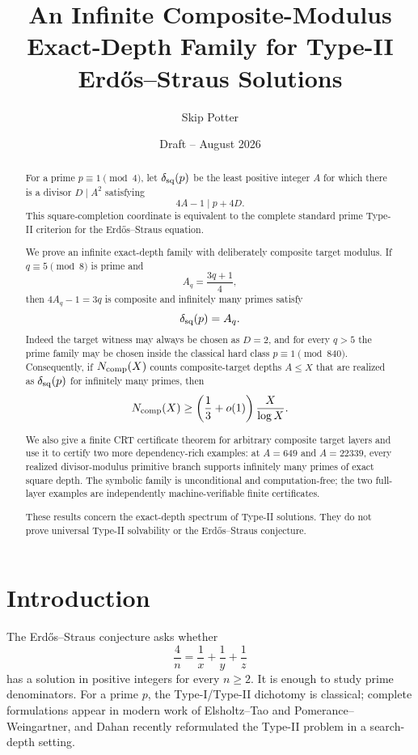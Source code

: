 \documentclass[11pt]{article}
\title{An Infinite Composite-Modulus Exact-Depth Family for Type-II Erd\H{o}s--Straus Solutions}
\author{Skip Potter}
\date{Draft -- August 2026}
\theoremstyle{definition}
\begin{document}
\maketitle

\begin{abstract}
For a prime $p\equiv1\pmod4$, let $\delta_{\rm sq}(p)$ be the least positive integer $A$ for which there is a divisor $D\mid A^2$ satisfying
\[
4A-1\mid p+4D.
\]
This square-completion coordinate is equivalent to the complete standard prime Type-II criterion for the Erd\H{o}s--Straus equation.

We prove an infinite exact-depth family with deliberately composite target modulus.  If $q\equiv5\pmod8$ is prime and
\[
A_q=\frac{3q+1}{4},
\]
then $4A_q-1=3q$ is composite and infinitely many primes satisfy
\[
\delta_{\rm sq}(p)=A_q.
\]
Indeed the target witness may always be chosen as $D=2$, and for every $q>5$ the prime family may be chosen inside the classical hard class $p\equiv1\pmod{840}$.  Consequently, if $N_{\rm comp}(X)$ counts composite-target depths $A\le X$ that are realized as $\delta_{\rm sq}(p)$ for infinitely many primes, then
\[
N_{\rm comp}(X)\ge\left(\frac13+o(1)\right)\frac{X}{\log X}.
\]

We also give a finite CRT certificate theorem for arbitrary composite target layers and use it to certify two more dependency-rich examples: at $A=649$ and $A=22339$, every realized divisor-modulus primitive branch supports infinitely many primes of exact square depth.  The symbolic family is unconditional and computation-free; the two full-layer examples are independently machine-verifiable finite certificates.

These results concern the exact-depth spectrum of Type-II solutions.  They do not prove universal Type-II solvability or the Erd\H{o}s--Straus conjecture.
\end{abstract}

\section{Introduction}
The Erd\H{o}s--Straus conjecture asks whether
\[
\frac4n=\frac1x+\frac1y+\frac1z
\]
has a solution in positive integers for every $n\ge2$.  It is enough to study prime denominators.  For a prime $p$, the Type-I/Type-II dichotomy is classical; complete formulations appear in modern work of Elsholtz--Tao and Pomerance--Weingartner, and Dahan recently reformulated the Type-II problem in a search-depth setting.
\end{document}
